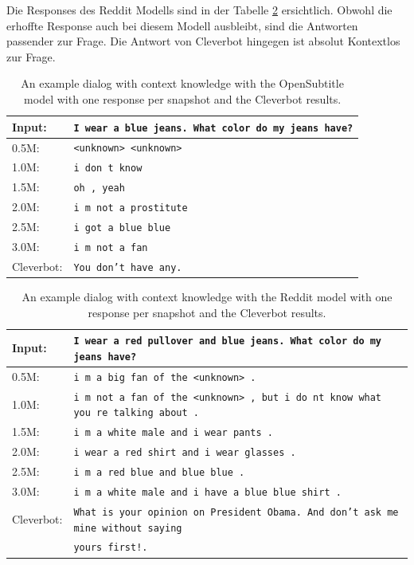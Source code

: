 Die Responses des Reddit Modells sind in der Tabelle \ref{results:example4_output:Reddit_compared} ersichtlich. Obwohl die erhoffte Response auch bei diesem Modell ausbleibt, sind die Antworten passender zur Frage. Die Antwort von Cleverbot hingegen ist absolut Kontextlos zur Frage.
\begin{table}[H]
	\centering
	\begin{adjustbox}{max width=\textwidth}
		\begin{tabular}{ll}
			\toprule
			Input: 	& \texttt{I wear a blue jeans. What color do my jeans have?}\\
			\midrule
			0.5M: 	& \texttt{<unknown> <unknown>}\\
			1.0M: 	& \texttt{i don t know}\\
			1.5M:	& \texttt{oh , yeah}\\
			2.0M:	& \texttt{i m not a prostitute}\\
			2.5M:	& \texttt{i got a blue blue}\\
			3.0M:	& \texttt{i m not a fan}\\
			Cleverbot:	& \texttt{You don't have any.}\\
			\bottomrule
		\end{tabular}
	\end{adjustbox}
	\caption{An example dialog with context knowledge with the OpenSubtitle model with one response per snapshot and the Cleverbot results.}
	\label{results:example4_output:OpenSubtitle_compared}
\end{table}
\begin{table}[H]
	\centering
	\begin{adjustbox}{max width=\textwidth}
		\begin{tabular}{ll}
			\toprule
			Input: 	& \texttt{I wear a red pullover and blue jeans. What color do my jeans have?}\\
			\midrule
			0.5M: 	& \texttt{i m a big fan of the <unknown> .}\\
			1.0M: 	& \texttt{i m not a fan of the <unknown> , but i do nt know what you re talking about .}\\
			1.5M:	& \texttt{i m a white male and i wear pants .}\\
			2.0M:	& \texttt{i wear a red shirt and i wear glasses .}\\
			2.5M:	& \texttt{i m a red blue and blue blue .}\\
			3.0M:	& \texttt{i m a white male and i have a blue blue shirt .}\\
			Cleverbot:	& \texttt{What is your opinion on President Obama. And don't ask me mine without saying}\\
			& \texttt{yours first!.}\\
			\bottomrule
		\end{tabular}
	\end{adjustbox}
	\caption{An example dialog with context knowledge with the Reddit model with one response per snapshot and the Cleverbot results.}
	\label{results:example4_output:Reddit_compared}
\end{table}

